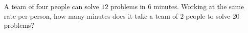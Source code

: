 A team of four people can solve $12$ problems in $6$ minutes. Working at the same rate per person, how many minutes does it take a team of $2$ people to solve $20$ problems?
